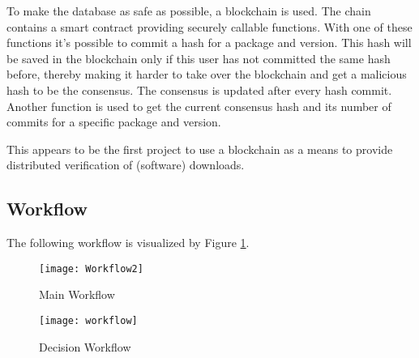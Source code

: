 To make the database as safe as possible, a blockchain is used. The chain contains a smart contract providing securely callable functions. With one of these functions it's possible to commit a hash for a package and version. This hash will be saved in the blockchain only if this user has not committed the same hash before, thereby making it harder to take over the blockchain and get a malicious hash to be the consensus. The consensus is updated after every hash commit. Another function is used to get the current consensus hash and its number of commits for a specific package and version.

This appears to be the first project to use a blockchain as a means to provide distributed verification of (software) downloads.

\subsection*{Workflow}
\label{sec:workflow}
The following workflow is visualized by Figure \ref{fig:main_workflow}.
\begin{figure}
	\centering
		\texttt{[image: Workflow2]}
	\caption{Main Workflow}
	\label{fig:main_workflow}
\end{figure}

\begin{figure}
	\centering
		\texttt{[image: workflow]}
	\caption{Decision Workflow}
	\label{fig:decision_workflow}
\end{figure}


